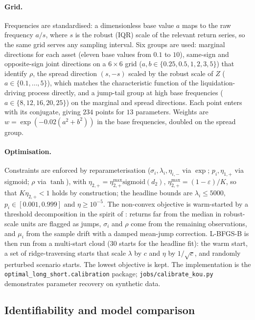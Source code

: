 \documentclass[11pt]{article}
\theoremstyle{plain}
\theoremstyle{definition}
\theoremstyle{remark}
\begin{document}
\paragraph{Grid.} Frequencies are standardised: a dimensionless base value $a$ maps to the raw
frequency $a/s$, where $s$ is the robust (IQR) scale of the relevant return series, so the same grid
serves any sampling interval. Six groups are used: marginal directions for each asset
(eleven base values from $0.1$ to $10$), same-sign and opposite-sign joint directions on a
$6\times6$ grid ($a,b\in\{0.25,0.5,1,2,3,5\}$) that identify $\rho$, the spread direction $(s,-s)$
scaled by the robust scale of $Z$ ($a\in\{0.1,\ldots,5\}$), which matches the characteristic function
of the liquidation-driving process directly, and a jump-tail group at high base frequencies
($a\in\{8,12,16,20,25\}$) on the marginal and spread directions. Each point enters with its
conjugate, giving $234$ points for $13$ parameters. Weights are $w=\exp(-0.02(a^2+b^2))$ in the
base frequencies, doubled on the spread group.

\paragraph{Optimisation.} Constraints are enforced by reparameterisation ($\sigma_i,\lambda_i,\eta_{i,-}$
via $\exp$; $p_i,\eta_{1,+}$ via sigmoid; $\rho$ via $\tanh$), with
$\eta_{2,+}=\eta_{2,+}^{\max}\mathrm{sigmoid}(d_2)$, $\eta_{2,+}^{\max}=(1-\varepsilon)/K$, so that
$K\eta_{2,+}<1$ holds by construction; the headline bounds are $\lambda_i\le5000$,
$p_i\in[0.001,0.999]$ and $\eta\ge10^{-5}$. The non-convex objective is warm-started by a threshold
decomposition in the spirit of \citet{Mancini2009}: returns far from the median in robust-scale units
are flagged as jumps, $\sigma_i$ and $\rho$ come from the remaining observations, and $\mu_i$ from the
sample drift with a damped mean-jump correction. L-BFGS-B is then run from a multi-start cloud ($30$
starts for the headline fit): the warm start, a set of ridge-traversing starts that scale $\lambda$ by
$c$ and $\eta$ by $1/\sqrt c$, and randomly perturbed scenario starts. The lowest objective is kept.
The implementation is the \texttt{optimal\_long\_short.calibration} package;
\texttt{jobs/calibrate\_kou.py} demonstrates parameter recovery on synthetic data.

\subsection{Identifiability and model comparison}\label{sec:ecf-ident}
\end{document}
